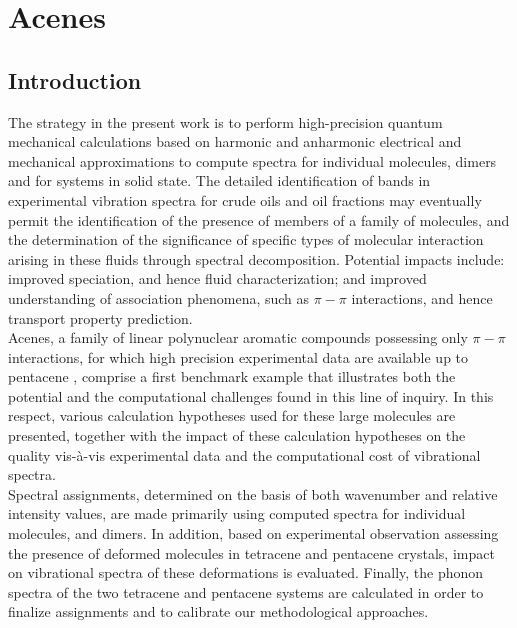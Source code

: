 \chapter[Phonon calculation]{Acenes}
\minitoc
\restoregeometry

\newpage

\section*{Introduction}

The strategy in the present work is to perform high-precision quantum mechanical calculations based on harmonic and anharmonic electrical and mechanical approximations to compute spectra for individual molecules, dimers and for systems in solid state.  The detailed identification of bands in experimental vibration spectra for crude oils and oil fractions may eventually permit the identification of the presence of members of a family of molecules, and the determination of the significance of specific types of molecular interaction arising in these fluids through spectral decomposition. Potential impacts include: improved speciation, and hence fluid characterization; and improved understanding of association phenomena, such as $\pi-\pi$ interactions, and hence transport property prediction.\\ 

Acenes, a family of linear polynuclear aromatic compounds possessing only $\pi-\pi$ interactions, for which high precision experimental data are available up to pentacene \cite{michaelian2012far}, comprise a first benchmark example that illustrates both the potential and the computational challenges found in this line of inquiry. In this respect, various calculation hypotheses used for these large molecules are presented, together with the impact of these calculation hypotheses on the quality vis-à-vis experimental data and the computational cost of vibrational spectra.\\

Spectral assignments, determined on the basis of both wavenumber and relative intensity values, are made primarily using computed spectra for individual molecules, and dimers. In addition, based on experimental observation assessing the presence of deformed molecules in tetracene and pentacene crystals, impact on vibrational spectra of these deformations is evaluated. Finally, the phonon spectra of the two tetracene and pentacene systems are calculated in order to finalize assignments and to calibrate our methodological approaches. 

